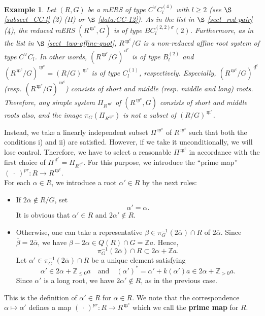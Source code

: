 \documentclass[11pt]{amsart}
\newcommand{\Z}{\mathbb{Z}}
\newcommand{\dc}{\,\underline{\mathrm{d}}^c}
\newcommand{\mc}{\, \underline{\mathrm{m}}^c}
\newtheorem{ex}[defn]{Example}%
\begin{document}
{\begin{ex}{\rm
Let $(R,G)$ be a mERS of type $C^\vee C_l^{(4)}$ with $l\geq 2$
(see $\S$ \ref{subsect_CC-l} (2) (II) or $\S$ \ref{data:CC-12}).
As in the list in $\S$ \ref{sect_red-pair} (4), 
the reduced mERS $(R^{\mc},G)$ is of type 
$BC_l^{(2,2)\sigma}(2)$. Furthermore, as in the list in $\S$ \ref{sect_two-affine-quot},
$R^{\mc}/G$ is a non-reduced affine root system of type $C^\vee C_l$. 
In other words, $(R^{\mc}/G)^{\dc}$ is of type $B_l^{(2)}$ and 
$(R^{\mc}/G)^{\mc}=(R/G)^{\mc}$ is of type $C_l^{(1)}$, respectively.  Especially, 
$(R^{\mc}/G)^{\dc}$ (resp. $(R^{\mc}/G)^{\mc}$) 
consists of short and middle (resp. middle and long) roots. Therefore, any simple 
system $\Pi_{R^{\mc}}$ of $(R^{\mc},G)$ consists of short and middle roots also, and 
the image $\pi_G(\Pi_{R^{\mc}})$ is not a subset of $(R/G)^{\mc}$.
}\end{ex}

Instead, we take a linearly independent subset $\Pi^{\mc}$ of $R^{\mc}$ such that both 
the conditions i) and ii) are satisfied. However, if we take it unconditionally, we will 
lose control. Therefore, we have to select a reasonable $\Pi^{\mc}$ 
in accordance with the first 
choice of $\Pi^{\dc}=\Pi_{R^{\dc}}$. For this purpose, we introduce  the ``prime map'' 
$(\ \cdot\ )^{pr}:R\to R^{\mc}$. \\

For each $\alpha \in R$, we introduce a root 
$\alpha'\in R$ by 
the next rules: 
\begin{itemize}
\item[i)] If $2\overline{\alpha}\not\in R/G$, set
\[\alpha'=\alpha.\]
It is obvious that $\alpha'\in R$ and $2\alpha'\not\in R$.
\vskip 1mm
\item[ii)]  
Otherwise, one can take a
representative $\beta\in \pi_G^{-1}(2\overline{\alpha})\cap R$ of 
$2\overline{\alpha}$. Since 
$\overline{\beta}=2\overline{\alpha}$, we have
$\beta-2\alpha\in Q(R)\cap G=\Z a$. 
Hence,
\[\pi_G^{-1}(2\overline{\alpha})\cap R\subset 2\alpha+\Z a.\]
Let $\alpha'\in 
\pi_G^{-1}(2\overline{\alpha})\cap R$ be a unique element satisfying
\[\alpha'\in 2\alpha+\Z_{\leq 0}a\quad\text{and}\quad
(\alpha')^*=\alpha'+k(\alpha')a\in 2\alpha+\Z_{>0}a.\]
Since $\alpha'$ is a long root, we have $2\alpha'\not\in R$, 
as in the previous case.
\end{itemize} 
This is the definition of $\alpha'\in R$ for $\alpha\in R$. We note that the 
correspondence $\alpha \mapsto \alpha'$ defines a map 
$(\,\cdot\,)^{pr}:R\to R^{\mc}$ which we call the 
\textbf{prime map} 
for $R$. 

}
\end{document}
